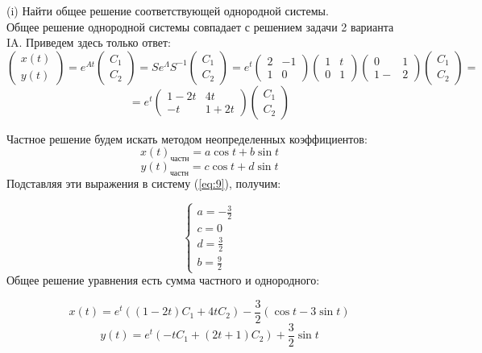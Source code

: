 \documentclass[a4paper, 12pt]{article}
\begin{document}
(i) Найти общее решение соответствующей однородной системы.\\
Общее решение однородной системы совпадает с решением задачи 2 варианта IA. Приведем здесь только ответ:
\[\left(
\begin{array}{c}
x(t)\\
y(t)
\end{array}
\right)=e^{At}\left(
\begin{array}{c}
C_1 \\
C_2
\end{array}
\right)=Se^{\Lambda}S^{-1}\left(
\begin{array}{c}
C_1 \\
C_2
\end{array}
\right)=e^t
\left(
\begin{array}{cc}
2 & -1 \\
1 & 0
\end{array}
\right)
\left(
\begin{array}{cc}
1 & t \\
0 & 1
\end{array}
\right)
\left(
\begin{array}{cc}
0 & 1 \\
1- & 2
\end{array}
\right)\left(
\begin{array}{c}
C_1 \\
C_2
\end{array}
\right)=\]\[
=e^t
\left(
\begin{array}{cc}
1-2t & 4t \\
-t & 1+2t
\end{array}
\right)\left(
\begin{array}{c}
C_1 \\
C_2
\end{array}
\right)\]

Частное решение будем искать методом неопределенных коэффициентов:
\[x(t)_{\text{частн}}=a\cos{t}+b\sin{t}\]
\[y(t)_{\text{частн}}=c\cos{t}+d\sin{t}\]
Подставляя эти выражения в систему (\ref{eq:9}), получим:

\[
\left\{
\begin{array}{lr}
a = - \frac 3 2 \\
c = 0 \\
d =  \frac 3 2  \\
b= \frac 9 2 
\end{array}
\right.
\]
Общее решение уравнения есть сумма частного и однородного:

\begin{equation}
x(t) = e^t\left(\left(1-2t\right)C_1+4tC_2\right)- \frac 3 2 (\cos{t}-3\sin{t})
\label{eq:10}
\end{equation}
\begin{equation}
y(t) = e^t\left(-tC_1+\left(2t+1\right)C_2\right)+ \frac 3 2 \sin{t}
\label{eq:11}
\end{equation}
\end{document}
